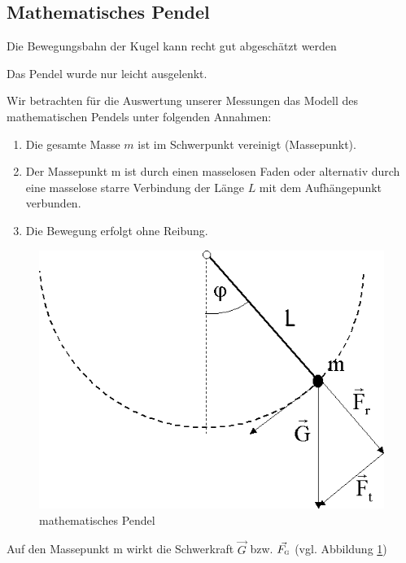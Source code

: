 \documentclass[11pt,a4paper,titlepage, ngerman]{article}
\begin{document}
		\subsection{Mathematisches Pendel}
		\label{pendel}
		
		
		Die Bewegungsbahn der Kugel kann recht gut abgeschätzt werden %
		
			Das Pendel wurde nur leicht ausgelenkt. %
			
			Wir betrachten für die Auswertung unserer Messungen das Modell des mathematischen Pendels unter folgenden Annahmen:
			
			\begin{enumerate}
				\item Die gesamte Masse $m$ ist im Schwerpunkt vereinigt (Massepunkt).
				\item Der Massepunkt m ist durch einen masselosen Faden oder alternativ durch eine masselose starre Verbindung der Länge $L$ mit dem Aufhängepunkt verbunden.
				\item Die Bewegung erfolgt ohne Reibung.
			\end{enumerate}
			
			\begin{figure}[ht]
				\centering
				\includegraphics[scale=0.4]{mathematischesPendel.png}		
				\caption{mathematisches Pendel}
				\label{fig:matpendel}
			\end{figure}
			
			\setlength{\parindent}{0em}
				Auf den Massepunkt m wirkt die Schwerkraft $ \vec{G}$ bzw. $ \vec{F_\textsc{g}}$ (vgl. Abbildung \ref{fig:matpendel}) \\
			
\end{document}
